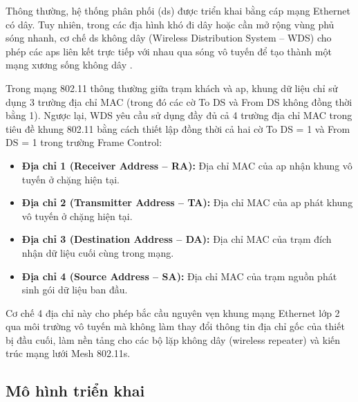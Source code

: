 Thông thường, hệ thống phân phối (\ac{ds}) được triển khai bằng cáp mạng Ethernet có dây. Tuy nhiên, trong các địa hình khó đi dây hoặc cần mở rộng vùng phủ sóng nhanh, cơ chế \ac{ds} không dây (Wireless Distribution System -- WDS) cho phép các \acp{ap} liên kết trực tiếp với nhau qua sóng vô tuyến để tạo thành một mạng xương sống không dây \cite{gast2005, coleman2021}.

Trong mạng 802.11 thông thường giữa trạm khách và \ac{ap}, khung dữ liệu chỉ sử dụng 3 trường địa chỉ MAC (trong đó các cờ To DS và From DS không đồng thời bằng 1). Ngược lại, WDS yêu cầu sử dụng đầy đủ cả 4 trường địa chỉ MAC trong tiêu đề khung 802.11 bằng cách thiết lập đồng thời cả hai cờ To DS = 1 và From DS = 1 trong trường Frame Control:
\begin{itemize}
  \item \textbf{Địa chỉ 1 (Receiver Address -- RA):} Địa chỉ MAC của \ac{ap} nhận khung vô tuyến ở chặng hiện tại.
  \item \textbf{Địa chỉ 2 (Transmitter Address -- TA):} Địa chỉ MAC của \ac{ap} phát khung vô tuyến ở chặng hiện tại.
  \item \textbf{Địa chỉ 3 (Destination Address -- DA):} Địa chỉ MAC của trạm đích nhận dữ liệu cuối cùng trong mạng.
  \item \textbf{Địa chỉ 4 (Source Address -- SA):} Địa chỉ MAC của trạm nguồn phát sinh gói dữ liệu ban đầu.
\end{itemize}
Cơ chế 4 địa chỉ này cho phép bắc cầu nguyên vẹn khung mạng Ethernet lớp 2 qua môi trường vô tuyến mà không làm thay đổi thông tin địa chỉ gốc của thiết bị đầu cuối, làm nền tảng cho các bộ lặp không dây (wireless repeater) và kiến trúc mạng lưới Mesh 802.11s.

\subsection{Mô hình triển khai}

